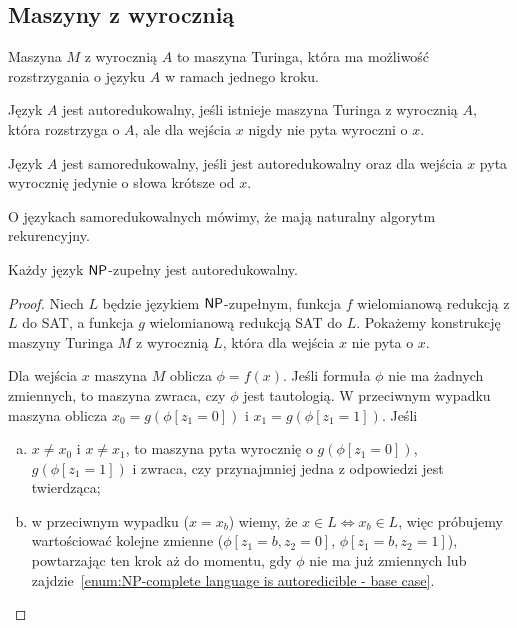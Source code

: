 \subsection{Maszyny z wyrocznią}

Maszyna $M$ z wyrocznią $A$ to maszyna Turinga, która ma możliwość rozstrzygania o języku $A$ w ramach jednego kroku.

\begin{definition}[autoredukcja]
    Język $A$ jest autoredukowalny, jeśli istnieje maszyna Turinga z wyrocznią $A$, która rozstrzyga o $A$, ale dla wejścia $x$ nigdy nie pyta wyroczni o $x$.
\end{definition}

\begin{definition}[samoredukcja]
    Język $A$ jest samoredukowalny, jeśli jest autoredukowalny oraz dla wejścia $x$ pyta wyrocznię jedynie o słowa krótsze od $x$.
\end{definition}

O językach samoredukowalnych mówimy, że mają naturalny algorytm rekurencyjny.

\begin{theorem}
    Każdy język $\textsf{NP}$-zupełny jest autoredukowalny.
\end{theorem}
\begin{proof}
    Niech $L$ będzie językiem $\textsf{NP}$-zupełnym, funkcja $f$ wielomianową redukcją z $L$ do SAT, a funkcja $g$ wielomianową redukcją SAT do $L$. Pokażemy konstrukcję maszyny Turinga $M$ z wyrocznią $L$, która dla wejścia $x$ nie pyta o $x$.

    Dla wejścia $x$ maszyna $M$ oblicza $\phi = f(x)$. Jeśli formuła $\phi$ nie ma żadnych zmiennych, to maszyna zwraca, czy $\phi$ jest tautologią. W przeciwnym wypadku maszyna oblicza $x_0 = g(\phi[z_1 \!=\! 0])$ i $x_1 = g(\phi[z_1 \!=\! 1])$. Jeśli
    \begin{enumerate}[(a)]
        \item $x \neq x_0$ i $x \neq x_1$, to maszyna pyta wyrocznię o $g(\phi[z_1 \!=\! 0])$, $g(\phi[z_1 \!=\! 1])$ i zwraca, czy przynajmniej jedna z odpowiedzi jest twierdząca;\label{enum:NP-complete language is autoredicible - base case}
        \item w przeciwnym wypadku ($x = x_b$) wiemy, że $x \in L \iff x_b \in L$, więc próbujemy wartościować kolejne zmienne ($\phi[z_1 \!=\! b, z_2 \!=\! 0]$, $\phi[z_1 \!=\! b, z_2 \!=\! 1]$), powtarzając ten krok aż do momentu, gdy $\phi$ nie ma już zmiennych lub zajdzie~\ref{enum:NP-complete language is autoredicible - base case}.
    \end{enumerate}
\end{proof}

